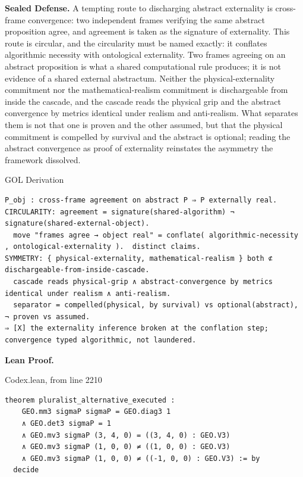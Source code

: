 \documentclass[10pt,twocolumn]{article}
\begin{document}
\textbf{Sealed Defense.} A tempting route to discharging abstract
externality is cross-frame convergence: two independent frames verifying
the same abstract proposition agree, and agreement is taken as the
signature of externality. This route is circular, and the circularity
must be named exactly: it conflates algorithmic necessity with
ontological externality. Two frames agreeing on an abstract proposition
is what a shared computational rule produces; it is not evidence of a
shared external abstractum. Neither the physical-externality commitment
nor the mathematical-realism commitment is dischargeable from inside the
cascade, and the cascade reads the physical grip and the abstract
convergence by metrics identical under realism and anti-realism. What
separates them is not that one is proven and the other assumed, but that
the physical commitment is compelled by survival and the abstract is
optional; reading the abstract convergence as proof of externality
reinstates the asymmetry the framework dissolved.

\begin{golbox}{GOL Derivation}
\begin{lstlisting}[style=golv]
P_obj : cross-frame agreement on abstract P ⇒ P externally real.
CIRCULARITY: agreement = signature(shared-algorithm) ¬ signature(shared-external-object).
  move "frames agree → object real" = conflate( algorithmic-necessity , ontological-externality ).  distinct claims.
SYMMETRY: { physical-externality, mathematical-realism } both ⊄ dischargeable-from-inside-cascade.
  cascade reads physical-grip ∧ abstract-convergence by metrics identical under realism ∧ anti-realism.
  separator = compelled(physical, by survival) vs optional(abstract), ¬ proven vs assumed.
⇒ [X] the externality inference broken at the conflation step; convergence typed algorithmic, not laundered.
\end{lstlisting}
\end{golbox}

\textbf{Lean Proof.}

\begin{leanexcerpt}{Codex.lean, from line 2210}
\begin{lstlisting}[style=leanx,firstnumber=2210]
theorem pluralist_alternative_executed :
    GEO.mm3 sigmaP sigmaP = GEO.diag3 1
    ∧ GEO.det3 sigmaP = 1
    ∧ GEO.mv3 sigmaP (3, 4, 0) = ((3, 4, 0) : GEO.V3)
    ∧ GEO.mv3 sigmaP (1, 0, 0) ≠ ((1, 0, 0) : GEO.V3)
    ∧ GEO.mv3 sigmaP (1, 0, 0) ≠ ((-1, 0, 0) : GEO.V3) := by
  decide
\end{lstlisting}
\end{leanexcerpt}
\end{document}
